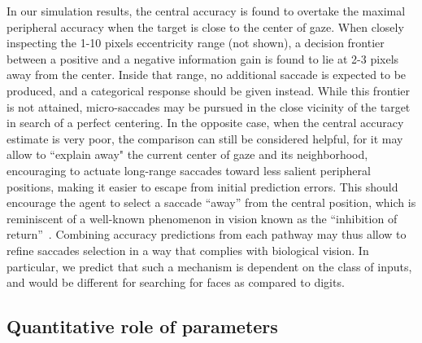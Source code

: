 In our simulation results, the central accuracy is found to overtake the maximal peripheral accuracy when the target is close to the center of gaze. When closely inspecting the 1-10 pixels eccentricity range (not shown), a decision frontier between a positive and a negative information gain is found to lie at 2-3 pixels away from the center. Inside that range, no additional saccade is expected to be produced, and a categorical response should be given instead.  %
While this frontier is not attained, micro-saccades may be pursued in the close vicinity of the target in search of a perfect centering.
In the opposite case, when the central accuracy estimate is very poor, the comparison can still be considered helpful, for it may allow to ``explain away" the current center of gaze and its neighborhood, encouraging to actuate long-range saccades toward less salient peripheral positions, making it easier to escape from initial prediction errors.
This should encourage the agent to select a saccade ``away'' from the central position, which is reminiscent of a well-known phenomenon in vision known as the ``inhibition of return''~\cite{Itti01}. Combining accuracy predictions from each pathway may thus allow to refine saccades selection in a way that complies with biological vision.
In particular, we predict that such a mechanism is dependent on the class of inputs, and would be different for searching for faces as compared to digits.
\\

\subsection{Quantitative role of parameters}


